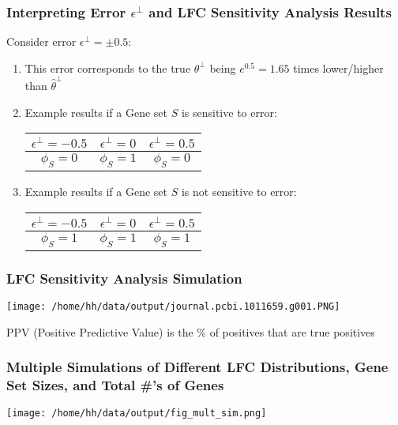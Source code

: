 \documentclass[11pt,t]{beamer}
\begin{document}
\begin{frame}
  \frametitle{Interpreting Error \(\epsilon^\perp\) and LFC Sensitivity Analysis Results}

  Consider error \(\epsilon^\perp = \pm 0.5\):
  \begin{enumerate}
  \item This error corresponds to the true \(\theta^\perp\) being \(e^{0.5}=1.65\) times lower/higher than \(\hat{\theta}^\perp\)
    \pause
    \item Example results if a Gene set \(S\) is sensitive to error:
      \begin{center}
        \begin{tabular}{ |c|c|c| } 
        \hline
        \(\epsilon^\perp=-0.5\) & \(\epsilon^\perp=0\) & \(\epsilon^\perp=0.5\) \\
        \hline
        \(\phi_S=0\) & \(\phi_S=1\) & \(\phi_S=0\) \\
        \hline
        \end{tabular}
      \end{center}
    \pause
    \item Example results if a Gene set \(S\) is not sensitive to error:
      \begin{center}
        \begin{tabular}{ |c|c|c| }
        \hline
        \(\epsilon^\perp=-0.5\) & \(\epsilon^\perp=0\) & \(\epsilon^\perp=0.5\) \\
        \hline
        \(\phi_S=1\) & \(\phi_S=1\) & \(\phi_S=1\) \\
        \hline
        \end{tabular}
      \end{center}
  \end{enumerate}
\end{frame}

\begin{frame}
  \frametitle{LFC Sensitivity Analysis Simulation}
  
  \begin{center}
    \texttt{[image: /home/hh/data/output/journal.pcbi.1011659.g001.PNG]}
  \end{center}

  \small{PPV (Positive Predictive Value) is the \% of positives that are true positives}
 
\end{frame}

\begin{frame}
  \frametitle{Multiple Simulations of Different LFC Distributions, Gene Set Sizes, and Total \#'s of Genes}
  \begin{center}
    \texttt{[image: /home/hh/data/output/fig\_mult\_sim.png]}
  \end{center}
\end{frame}
  
\end{document}
